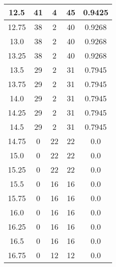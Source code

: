 \documentclass[letterpaper, 12pt]{article}
\begin{document}
\begin{longtable}{|c|c|c|c|c|}
12.5 & 41 & 4 & 45 & 0.9425 \\
\hline
12.75 & 38 & 2 & 40 & 0.9268 \\
\hline
13.0 & 38 & 2 & 40 & 0.9268 \\
\hline
13.25 & 38 & 2 & 40 & 0.9268 \\
\hline
13.5 & 29 & 2 & 31 & 0.7945 \\
\hline
13.75 & 29 & 2 & 31 & 0.7945 \\
\hline
14.0 & 29 & 2 & 31 & 0.7945 \\
\hline
14.25 & 29 & 2 & 31 & 0.7945 \\
\hline
14.5 & 29 & 2 & 31 & 0.7945 \\
\hline
14.75 & 0 & 22 & 22 & 0.0 \\
\hline
15.0 & 0 & 22 & 22 & 0.0 \\
\hline
15.25 & 0 & 22 & 22 & 0.0 \\
\hline
15.5 & 0 & 16 & 16 & 0.0 \\
\hline
15.75 & 0 & 16 & 16 & 0.0 \\
\hline
16.0 & 0 & 16 & 16 & 0.0 \\
\hline
16.25 & 0 & 16 & 16 & 0.0 \\
\hline
16.5 & 0 & 16 & 16 & 0.0 \\
\hline
16.75 & 0 & 12 & 12 & 0.0 \\
\hline
\end{longtable}
\end{document}
